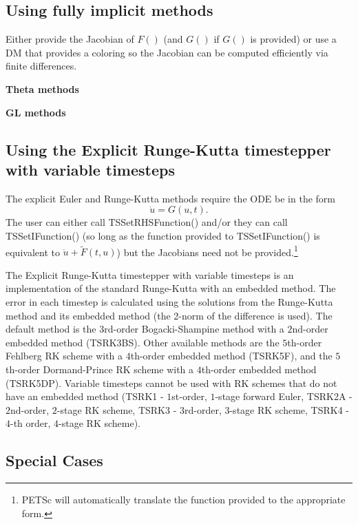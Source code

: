 \subsection{Using fully implicit methods}
Either provide the Jacobian of $F() $ (and $G()$ if $G()$ is provided) or use a DM that provides a coloring so the Jacobian can be computed efficiently via finite differences.

{\bf Theta methods}

{\bf GL methods}

\subsection{Using the Explicit Runge-Kutta timestepper with variable timesteps}
The explicit Euler and Runge-Kutta methods require the ODE be in the form
\[
    \dot{u} = G(u,t).
\]
The user can either call TSSetRHSFunction() and/or they can call TSSetIFunction() (so long as the function provided to TSSetIFunction() is equivalent to
$ \dot{u} + \tilde{F}(t,u) $) but
the Jacobians need not be provided.\footnote{PETSc will automatically translate the function provided to the appropriate form.}

The Explicit Runge-Kutta timestepper with variable timesteps is an 
implementation of the standard Runge-Kutta with an embedded method. The error in each
timestep is calculated using the solutions from the Runge-Kutta method and its embedded 
method (the 2-norm of the difference is used). The default method is the 
$3$rd-order Bogacki-Shampine method with a $2$nd-order embedded method (TSRK3BS). 
Other available methods are the  $5$th-order Fehlberg RK scheme with a $4$th-order embedded 
method (TSRK5F), and the  $5$th-order Dormand-Prince RK scheme with a $4$th-order embedded method 
(TSRK5DP). Variable timesteps cannot be used with RK schemes that do not have an embedded 
method (TSRK1 - $1$st-order, $1$-stage forward Euler, TSRK2A - $2$nd-order, $2$-stage RK scheme, 
TSRK3 - $3$rd-order, $3$-stage RK scheme, TSRK4 - $4$-th order, $4$-stage RK scheme).

\subsection{Special Cases}


